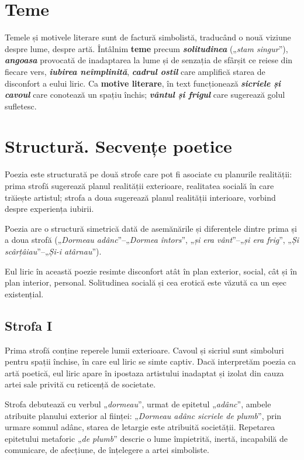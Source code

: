 \documentclass{article}
\newcommand{\qu}[1]{„\emph{#1}”}
\begin{document}
\section{Teme}
Temele și motivele literare sunt de factură simbolistă, traducând o nouă viziune despre lume, despre artă. Întâlnim \textbf{teme} precum \textsl{\textbf{solitudinea}} (\qu{stam singur}), \textsl{\textbf{angoasa}} provocată de inadaptarea la lume și de senzația de sfârșit ce reiese din fiecare vers, \textsl{\textbf{iubirea neîmplinită}}, \textsl{\textbf{cadrul ostil}} care amplifică starea de disconfort a eului liric. Ca \textbf{motive literare}, în text funcționează \textsl{\textbf{sicriele și cavoul}} care conotează un spațiu închis; \textsl{\textbf{vântul și frigul}} care sugerează golul sufletesc.

\section{Structură. Secvențe poetice}
Poezia este structurată pe două strofe care pot fi asociate cu planurile realității: prima strofă sugerează planul realității exterioare, realitatea socială în care trăiește artistul; strofa a doua sugerează planul realității interioare, vorbind despre experiența iubirii.

Poezia are o structură simetrică dată de asemănările și diferențele dintre prima și a doua strofă (\qu{Dormeau adânc}--\qu{Dormea întors}, \qu{și era vânt}--\qu{și era frig}, \qu{Și scârțâiau}--\qu{Și-i atârnau}).

Eul liric în această poezie resimte disconfort atât în plan exterior, social, cât și în plan interior, personal. Solitudinea socială și cea erotică este văzută ca un eșec existențial.

\subsection{Strofa I}
Prima strofă conține reperele lumii exterioare. Cavoul și sicriul sunt simboluri pentru spații închise, în care eul liric se simte captiv. Dacă interpretăm poezia ca artă poetică, eul liric apare în ipostaza artistului inadaptat și izolat din cauza artei sale privită cu reticență de societate.

Strofa debutează cu verbul \qu{dormeau}, urmat de epitetul \qu{adânc}, ambele atribuite planului exterior al ființei: \qu{Dormeau adânc sicriele de plumb}, prin urmare somnul adânc, starea de letargie este atribuită societății. Repetarea epitetului metaforic \qu{de plumb} descrie o lume  împietrită, inertă, incapabilă de comunicare, de afecțiune, de înțelegere a artei simboliste.
\end{document}
